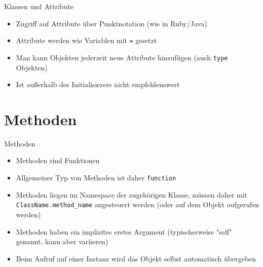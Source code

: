\begin{frame}[fragile]{Klassen und Attribute}
	\begin{itemize}
		\item Zugriff auf Attribute über Punktnotation (wie in Ruby/Java)
		\item Attribute werden wie Variablen mit \texttt{=} gesetzt
		\item Man kann Objekten jederzeit neue Attribute hinzufügen (auch \texttt{type} Objekten)
		\item Ist außerhalb des Initialisierers nicht empfehlenswert
	\end{itemize}
\end{frame}


\section{Methoden}
\begin{frame}[fragile]{Methoden}
	\begin{itemize}
		\item Methoden sind Funktionen
		\item Allgemeiner Typ von Methoden ist daher \texttt{function}
		\item Methoden liegen im Namespace der zugehörigen Klasse, müssen daher mit \texttt{ClassName.method\_name} angesteuert werden (oder auf dem Objekt aufgerufen werden)
		\item Methoden haben ein implizites erstes Argument (typischerweise "self" genannt, kann aber variieren)
		\item Beim Aufruf auf einer Instanz wird das Objekt selbst automatisch übergeben
	\end{itemize}
\end{frame}


